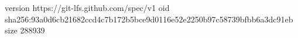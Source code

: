version https://git-lfs.github.com/spec/v1
oid sha256:93a0d6cb21682ccd4c7b172b5bce9d0116e52e2250b97c58739bfbb6a3dc91eb
size 288939
